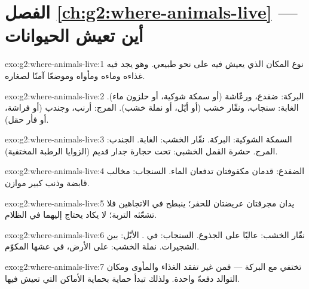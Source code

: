 \section*{الفصل \ref{ch:g2:where-animals-live} --- أين تعيش الحيوانات}

\begin{solution}{exo:g2:where-animals-live:1}
نوع المكان الذي يعيش فيه  على نحو طبيعي. وهو يجد فيه غذاءه
وماءه ومأواه وموضعًا آمنًا لصغاره.
\end{solution}

\begin{solution}{exo:g2:where-animals-live:2}
البركة: ضفدع، ورعّاشة (أو سمكة شوكية، أو حلزون ماء). الغابة:
سنجاب، ونقّار خشب (أو أيّل، أو نملة خشب). المرج: أرنب، وجندب (أو
فراشة، أو فأر حقل).
\end{solution}

\begin{solution}{exo:g2:where-animals-live:3}
السمكة الشوكية: البركة. نقّار الخشب: الغابة. الجندب: المرج. حشرة
القمل الخشبي: تحت حجارة جدار قديم (الزوايا الرطبة المختفية).
\end{solution}

\begin{solution}{exo:g2:where-animals-live:4}
الضفدع: قدمان مكفوفتان تدفعان الماء. السنجاب: مخالب قابضة وذنب
كبير موازن.
\end{solution}

\begin{solution}{exo:g2:where-animals-live:5}
يدان مجرفتان عريضتان للحفر؛  ينبطح في الاتجاهين فلا تشعّثه
التربة؛  لا يكاد يحتاج إليهما في الظلام.
\end{solution}

\begin{solution}{exo:g2:where-animals-live:6}
نقّار الخشب: عاليًا على الجذوع. السنجاب: في . الأيّل: بين
الشجيرات. نملة الخشب: على الأرض، في عشها المكوّم.
\end{solution}

\begin{solution}{exo:g2:where-animals-live:7}
تختفي مع البركة --- فمن غير  تفقد الغذاء والمأوى ومكان
التوالد دفعةً واحدة. ولذلك تبدأ حماية  بحماية الأماكن
التي تعيش فيها.
\end{solution}

